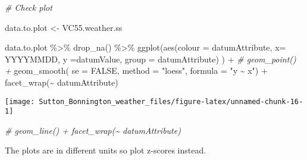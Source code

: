\documentclass{article}
\newenvironment{Shaded}{\begin{snugshade}}{\end{snugshade}}
\newcommand{\AttributeTok}[1]{\textcolor[rgb]{0.77,0.63,0.00}{#1}}
\newcommand{\CommentTok}[1]{\textcolor[rgb]{0.56,0.35,0.01}{\textit{#1}}}
\newcommand{\ConstantTok}[1]{\textcolor[rgb]{0.00,0.00,0.00}{#1}}
\newcommand{\FunctionTok}[1]{\textcolor[rgb]{0.00,0.00,0.00}{#1}}
\newcommand{\NormalTok}[1]{#1}
\newcommand{\OtherTok}[1]{\textcolor[rgb]{0.56,0.35,0.01}{#1}}
\newcommand{\SpecialCharTok}[1]{\textcolor[rgb]{0.00,0.00,0.00}{#1}}
\newcommand{\StringTok}[1]{\textcolor[rgb]{0.31,0.60,0.02}{#1}}
\begin{document}
\begin{Shaded}
\begin{Highlighting}[]
\CommentTok{\# Check plot}

\NormalTok{data.to.plot }\OtherTok{\textless{}{-}}\NormalTok{ VC55.weather.ss}

\NormalTok{data.to.plot }\SpecialCharTok{\%\textgreater{}\%} \FunctionTok{drop\_na}\NormalTok{() }\SpecialCharTok{\%\textgreater{}\%}
\FunctionTok{ggplot}\NormalTok{(}\FunctionTok{aes}\NormalTok{(}\AttributeTok{colour =}\NormalTok{ datumAttribute, }\AttributeTok{x=}\NormalTok{ YYYYMMDD, }\AttributeTok{y =}\NormalTok{datumValue, }\AttributeTok{group =}\NormalTok{ datumAttribute) ) }\SpecialCharTok{+} 
 \CommentTok{\# geom\_point() +}
  \FunctionTok{geom\_smooth}\NormalTok{( }\AttributeTok{se =} \ConstantTok{FALSE}\NormalTok{, }\AttributeTok{method =} \StringTok{"loess"}\NormalTok{, }\AttributeTok{formula =} \StringTok{"y \textasciitilde{} x"}\NormalTok{) }\SpecialCharTok{+}
  \FunctionTok{facet\_wrap}\NormalTok{(}\SpecialCharTok{\textasciitilde{}}\NormalTok{ datumAttribute)}
\end{Highlighting}
\end{Shaded}

\begin{center}\texttt{[image: Sutton\_Bonnington\_weather\_files/figure-latex/unnamed-chunk-16-1]} \end{center}

\begin{Shaded}
\begin{Highlighting}[]
 \CommentTok{\#   geom\_line() + facet\_wrap(\textasciitilde{} datumAttribute)}
\end{Highlighting}
\end{Shaded}

The plots are in different units so plot z-scores instead.
\end{document}
